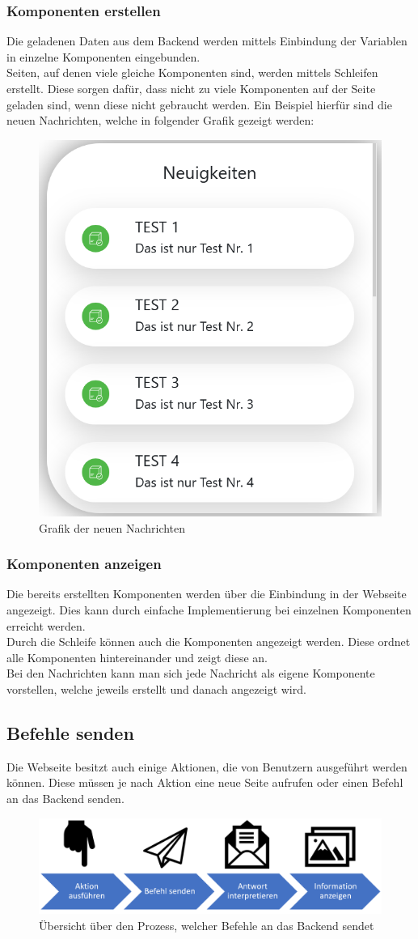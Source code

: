 \subsubsection{Komponenten erstellen}
Die geladenen Daten aus dem Backend werden mittels Einbindung der Variablen in einzelne Komponenten eingebunden.\\
Seiten, auf denen viele gleiche Komponenten sind, werden mittels Schleifen erstellt. Diese sorgen dafür, dass nicht zu viele Komponenten auf der Seite geladen sind, wenn diese nicht gebraucht werden.
Ein Beispiel hierfür sind die neuen Nachrichten, welche in folgender Grafik gezeigt werden:
\begin{figure}[H]
	\centering
	\includegraphics[width=0.3\linewidth]{images/messages_index}
	\caption[Neue Nachrichten]{Grafik der neuen Nachrichten}
	\label{fig:messagesindex}
\end{figure}

\subsubsection{Komponenten anzeigen}
Die bereits erstellten Komponenten werden über die Einbindung in der Webseite angezeigt. Dies kann durch einfache Implementierung bei einzelnen Komponenten erreicht werden.\\
Durch die Schleife können auch die Komponenten angezeigt werden. Diese ordnet alle Komponenten hintereinander  und zeigt diese an.\\
Bei den Nachrichten kann man sich jede Nachricht als eigene Komponente vorstellen, welche jeweils erstellt und danach angezeigt wird.
\subsection{Befehle senden}
Die Webseite besitzt auch einige Aktionen, die von Benutzern ausgeführt werden können. Diese müssen je nach Aktion eine neue Seite aufrufen oder einen Befehl an das Backend senden.

\begin{figure}[H]
	\centering
	\includegraphics[width=0.8\linewidth]{images/Prozess_Befehl_senden}
	\caption[Prozess der Befehlssendung]{Übersicht über den Prozess, welcher Befehle an das Backend sendet}
	\label{fig:prozessbefehlsenden}
\end{figure}

